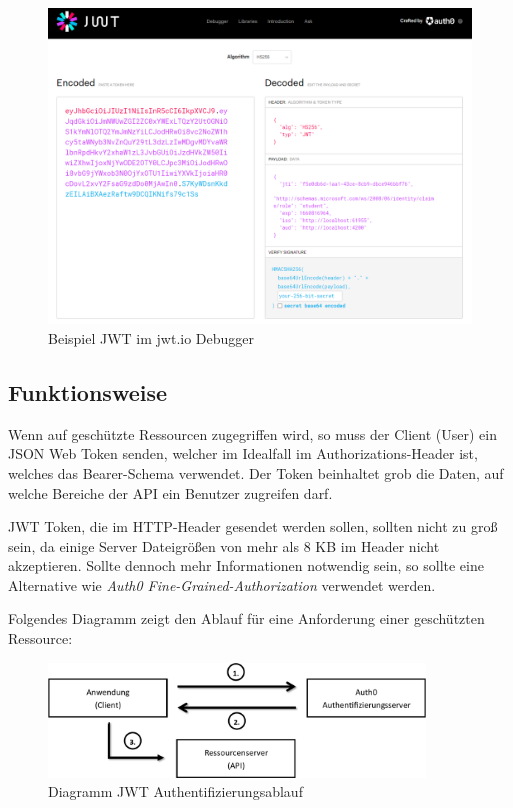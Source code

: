 \begin{figure}[h]
    \begin{center}
        \includegraphics*[width=15cm]{./pics/screenshot-JWT-token1.png}
        \caption[Bsp JWT in Debugger]{Beispiel JWT im jwt.io Debugger}
    \end{center}
\end{figure}

\subsection{Funktionsweise}
Wenn auf geschützte Ressourcen zugegriffen wird, so muss der Client (User) ein JSON Web Token senden, 
welcher im Idealfall im Authorizations-Header ist, welches das Bearer-Schema verwendet. 
Der Token beinhaltet grob die Daten, auf welche Bereiche der API ein Benutzer zugreifen darf. 

JWT Token, die im HTTP-Header gesendet werden sollen, sollten nicht zu groß sein, da einige Server Dateigrößen von mehr als 8 KB im Header nicht akzeptieren.
Sollte dennoch mehr Informationen notwendig sein, so sollte eine Alternative wie \textit{Auth0 Fine-Grained-Authorization} verwendet werden.

Folgendes Diagramm zeigt den Ablauf für eine Anforderung einer geschützten Ressource:

\begin{figure}[h]
    \begin{center}
        \includegraphics*[width=10cm]{./pics/Ablauf-JWT-Auth.png}
        \caption[Ablauf JWT Authentifizierung]{Diagramm JWT Authentifizierungsablauf}
    \end{center}
\end{figure}
    
